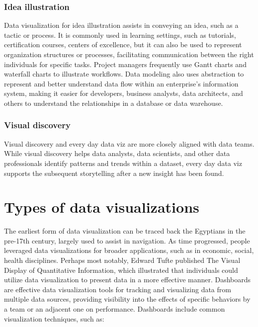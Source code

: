 \documentclass[MSE,Master,english]{twbook}%
\begin{document}
\subsubsection{Idea illustration}
Data visualization for idea illustration assists in conveying an idea, such as a tactic or process. It is commonly used in learning settings, such as tutorials, certification courses, centers of excellence, but it can also be used to represent organization structures or processes, facilitating communication between the right individuals for specific tasks. Project managers frequently use Gantt charts and waterfall charts to illustrate workflows. Data modeling also uses abstraction to represent and better understand data flow within an enterprise's information system, making it easier for developers, business analysts, data architects, and others to understand the relationships in a database or data warehouse.

\subsubsection{Visual discovery}
Visual discovery and every day data viz are more closely aligned with data teams. While visual discovery helps data analysts, data scientists, and other data professionals identify patterns and trends within a dataset, every day data viz supports the subsequent storytelling after a new insight has been found.

\section{Types of data visualizations}
The earliest form of data visualization can be traced back the Egyptians in the pre-17th century\cite{dataviz}, largely used to assist in navigation. As time progressed, people leveraged data visualizations for broader applications, such as in economic, social, health disciplines. Perhaps most notably, Edward Tufte published The Visual Display of Quantitative Information\cite{tufte1985visual}, which illustrated that individuals could utilize data visualization to present data in a more effective manner. Dashboards are effective data visualization tools for tracking and visualizing data from multiple data sources, providing visibility into the effects of specific behaviors by a team or an adjacent one on performance. Dashboards include common visualization techniques, such as:
\end{document}
